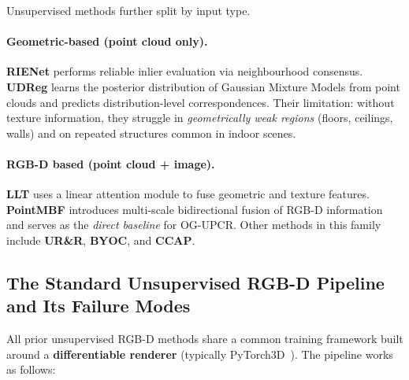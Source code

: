 \documentclass[11pt,a4paper]{article}
\begin{document}
Unsupervised methods further split by input type.

\paragraph{Geometric-based (point cloud only).}
\textbf{RIENet} performs reliable inlier evaluation via neighbourhood consensus.
\textbf{UDReg} learns the posterior distribution of Gaussian Mixture Models from point
clouds and predicts distribution-level correspondences. Their limitation: without texture
information, they struggle in \emph{geometrically weak regions} (floors, ceilings, walls)
and on repeated structures common in indoor scenes.

\paragraph{RGB-D based (point cloud + image).}
\textbf{LLT} uses a linear attention module to fuse geometric and texture features.
\textbf{PointMBF} introduces multi-scale bidirectional fusion of RGB-D information and
serves as the \emph{direct baseline} for OG-UPCR. Other methods in this family include
\textbf{UR\&R}, \textbf{BYOC}, and \textbf{CCAP}.

\subsection{The Standard Unsupervised RGB-D Pipeline and Its Failure Modes}
\label{sec:pipeline}

All prior unsupervised RGB-D methods share a common training framework built around a
\textbf{differentiable renderer} (typically PyTorch3D~\cite{ravi2020pytorch3d}). The
pipeline works as follows:

\begin{center}
\end{center}
\end{document}
